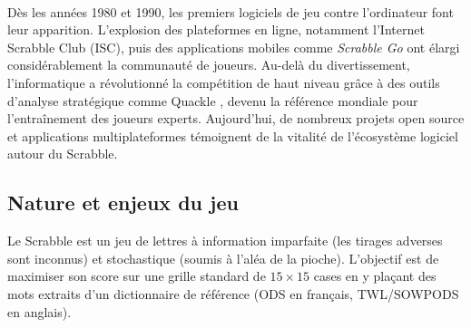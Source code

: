 \documentclass[a4paper]{article}
\begin{document}
  \paragraph{}
    Dès les années 1980 et 1990, les premiers logiciels de jeu contre l'ordinateur font leur apparition. L'explosion des plateformes en ligne, notamment l'Internet Scrabble Club (ISC), puis des applications mobiles comme \textit{Scrabble Go} ont élargi considérablement la communauté de joueurs. Au-delà du divertissement, l'informatique a révolutionné la compétition de haut niveau grâce à des outils d'analyse stratégique comme Quackle \cite{sheppard2006}, devenu la référence mondiale pour l'entraînement des joueurs experts. Aujourd'hui, de nombreux projets open source et applications multiplateformes témoignent de la vitalité de l'écosystème logiciel autour du Scrabble.

  \paragraph{}

    \subsection{Nature et enjeux du jeu}
    Le Scrabble est un jeu de lettres à information imparfaite (les tirages adverses sont inconnus) et stochastique (soumis à l'aléa de la pioche). L'objectif est de maximiser son score sur une grille standard de $15 \times 15$ cases en y plaçant des mots extraits d'un dictionnaire de référence (ODS en français, TWL/SOWPODS en anglais).
\end{document}
